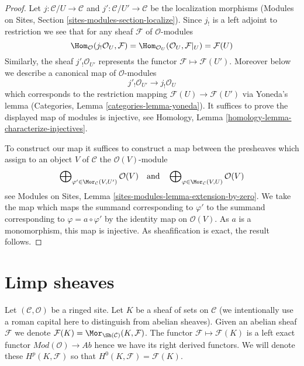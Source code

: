 \begin{proof}
Let $j : \mathcal{C}/U \to \mathcal{C}$ and
$j' : \mathcal{C}/U' \to \mathcal{C}$ be the localization morphisms
(Modules on Sites, Section \ref{sites-modules-section-localize}).
Since $j_!$ is a left adjoint to restriction we see that
for any sheaf $\mathcal{F}$ of $\mathcal{O}$-modules
$$
\Hom_\mathcal{O}(j_!\mathcal{O}_U, \mathcal{F})
=
\Hom_{\mathcal{O}_U}(\mathcal{O}_U, \mathcal{F}|_U)
=
\mathcal{F}(U)
$$
Similarly, the sheaf $j'_!\mathcal{O}_{U'}$ represents the
functor $\mathcal{F} \mapsto \mathcal{F}(U')$.
Moreover below we describe a canonical map of $\mathcal{O}$-modules
$$
j'_!\mathcal{O}_{U'} \longrightarrow j_!\mathcal{O}_U
$$
which corresponds to the restriction mapping
$\mathcal{F}(U) \to \mathcal{F}(U')$ via Yoneda's lemma
(Categories, Lemma \ref{categories-lemma-yoneda}).
It suffices to prove the displayed map of modules is injective, see
Homology, Lemma \ref{homology-lemma-characterize-injectives}.

\medskip\noindent
To construct our map it suffices to construct a map between the
presheaves which assign to an object $V$ of $\mathcal{C}$ the
$\mathcal{O}(V)$-module
$$
\bigoplus\nolimits_{\varphi' \in \Mor_\mathcal{C}(V, U')} \mathcal{O}(V)
\quad\text{and}\quad
\bigoplus\nolimits_{\varphi \in \Mor_\mathcal{C}(V, U)} \mathcal{O}(V)
$$
see Modules on Sites, Lemma \ref{sites-modules-lemma-extension-by-zero}.
We take the map which maps the summand corresponding to $\varphi'$
to the summand corresponding to $\varphi = a \circ \varphi'$
by the identity map on $\mathcal{O}(V)$. As $a$ is a monomorphism,
this map is injective. As sheafification is exact, the result
follows.
\end{proof}






\section{Limp sheaves}
\label{section-limp}

\noindent
Let $(\mathcal{C}, \mathcal{O})$ be a ringed site.
Let $K$ be a sheaf of sets on $\mathcal{C}$ (we intentionally use a
roman capital here to distinguish from abelian sheaves).
Given an abelian sheaf $\mathcal{F}$ we denote
$\mathcal{F}(K) = \Mor_{\Sh(\mathcal{C})}(K, \mathcal{F})$.
The functor $\mathcal{F} \mapsto \mathcal{F}(K)$ is a left exact functor
$\textit{Mod}(\mathcal{O}) \to \textit{Ab}$ hence we have its
right derived functors. We will denote these $H^p(K, \mathcal{F})$
so that $H^0(K, \mathcal{F}) = \mathcal{F}(K)$.

